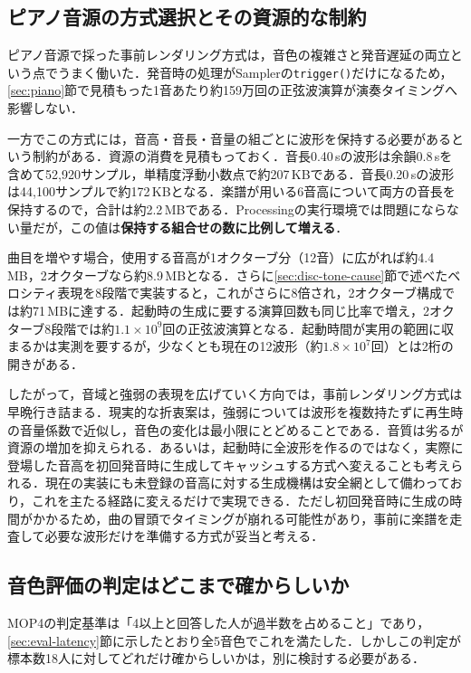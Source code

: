 \documentclass[uplatex,dvipdfmx]{jlreq}
\begin{document}
\subsection{ピアノ音源の方式選択とその資源的な制約}

ピアノ音源で採った事前レンダリング方式は，音色の複雑さと発音遅延の両立という点でうまく働いた．発音時の処理がSamplerの\texttt{trigger()}だけになるため，\ref{sec:piano}節で見積もった1音あたり約159万回の正弦波演算が演奏タイミングへ影響しない．

一方でこの方式には，音高・音長・音量の組ごとに波形を保持する必要があるという制約がある．資源の消費を見積もっておく．音長0.40\,sの波形は余韻0.8\,sを含めて52{,}920サンプル，単精度浮動小数点で約207\,KBである．音長0.20\,sの波形は44{,}100サンプルで約172\,KBとなる．楽譜が用いる6音高について両方の音長を保持するので，合計は約2.2\,MBである．Processingの実行環境では問題にならない量だが，この値は\textbf{保持する組合せの数に比例して増える}．

曲目を増やす場合，使用する音高が1オクターブ分（12音）に広がれば約4.4\,MB，2オクターブなら約8.9\,MBとなる．さらに\ref{sec:disc-tone-cause}節で述べたベロシティ表現を8段階で実装すると，これがさらに8倍され，2オクターブ構成では約71\,MBに達する．起動時の生成に要する演算回数も同じ比率で増え，2オクターブ8段階では約$1.1\times10^{9}$回の正弦波演算となる．起動時間が実用の範囲に収まるかは実測を要するが，少なくとも現在の12波形（約$1.8\times10^{7}$回）とは2桁の開きがある．

したがって，音域と強弱の表現を広げていく方向では，事前レンダリング方式は早晩行き詰まる．現実的な折衷案は，強弱については波形を複数持たずに再生時の音量係数で近似し，音色の変化は最小限にとどめることである．音質は劣るが資源の増加を抑えられる．あるいは，起動時に全波形を作るのではなく，実際に登場した音高を初回発音時に生成してキャッシュする方式へ変えることも考えられる．現在の実装にも未登録の音高に対する生成機構は安全網として備わっており，これを主たる経路に変えるだけで実現できる．ただし初回発音時に生成の時間がかかるため，曲の冒頭でタイミングが崩れる可能性があり，事前に楽譜を走査して必要な波形だけを準備する方式が妥当と考える．

\subsection{音色評価の判定はどこまで確からしいか}
\label{sec:disc-tone-stat}

MOP4の判定基準は「4以上と回答した人が過半数を占めること」であり，\ref{sec:eval-latency}節に示したとおり全5音色でこれを満たした．しかしこの判定が標本数18人に対してどれだけ確からしいかは，別に検討する必要がある．
\end{document}
